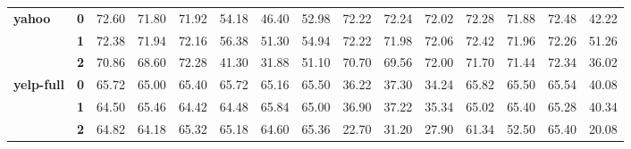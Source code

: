 \documentclass[11pt,a4paper]{article}
\begin{document}
\begin{table}
\begin{tabular}{lllllllllllllll}
		\hline
		\multirow{3}{*}{\textbf{yahoo}}     & \textbf{0} & 72.60                          & 71.80                          & 71.92                          & 54.18                          & 46.40                          & 52.98                          & 72.22                          & 72.24                          & 72.02                          & 72.28                          & 71.88                          & 72.48                          & 42.22                              \\
		& \textbf{1} & 72.38                          & 71.94                          & 72.16                          & 56.38                          & 51.30                          & 54.94                          & 72.22                          & 71.98                          & 72.06                          & 72.42                          & 71.96                          & 72.26                          & 51.26                              \\
		& \textbf{2} & 70.86                          & 68.60                          & 72.28                          & 41.30                          & 31.88                          & 51.10                          & 70.70                          & 69.56                          & 72.00                          & 71.70                          & 71.44                          & 72.34                          & 36.02                              \\
		\hline
		\multirow{3}{*}{\textbf{yelp-full}} & \textbf{0} & 65.72                          & 65.00                          & 65.40                          & 65.72                          & 65.16                          & 65.50                          & 36.22                          & 37.30                          & 34.24                          & 65.82                          & 65.50                          & 65.54                          & 40.08                              \\
		& \textbf{1} & 64.50                          & 65.46                          & 64.42                          & 64.48                          & 65.84                          & 65.00                          & 36.90                          & 37.22                          & 35.34                          & 65.02                          & 65.40                          & 65.28                          & 40.34                              \\
		& \textbf{2} & 64.82                          & 64.18                          & 65.32                          & 65.18                          & 64.60                          & 65.36                          & 22.70                          & 31.20                          & 27.90                          & 61.34                          & 52.50                          & 65.40                          & 20.08                              \\

\end{tabular}
\end{table}
\end{document}
